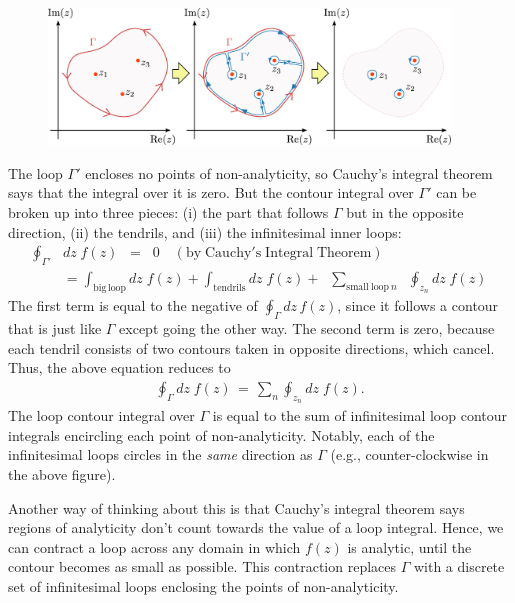 \documentclass[10pt,a4paper]{article}
\begin{document}
\begin{figure}[H]
  \centering\includegraphics[width=0.95\textwidth]{contour_deformation}
\end{figure}

The loop $\Gamma'$ encloses no points of non-analyticity, so Cauchy's
integral theorem says that the integral over it is zero.  But the
contour integral over $\Gamma'$ can be broken up into three pieces:
(i) the part that follows $\Gamma$ but in the opposite direction, (ii)
the tendrils, and (iii) the infinitesimal inner loops:
\begin{align}
  \oint_{\Gamma'}& dz\; f(z)
\;\;= \;\; 0 \quad (\mathrm{by}\;\mathrm{Cauchy's}\;\mathrm{Integral}\;\mathrm{Theorem}) \\
&= \int_{\mathrm{big}\,\mathrm{loop}} dz\; f(z) + \int_{\mathrm{tendrils}} dz\; f(z) +\; \;\sum_{\mathrm{small~loop}~n}\;\; \oint_{z_n} dz\; f(z)
\end{align}
The first term is equal to the negative of $\oint_\Gamma dz \, f(z)$,
since it follows a contour that is just like $\Gamma$ except going the
other way.  The second term is zero, because each tendril consists of
two contours taken in opposite directions, which cancel.  Thus, the
above equation reduces to
\begin{align}
  \oint_\Gamma dz\; f(z) \,=\, \sum_n \oint_{z_n} dz\; f(z).
\end{align}
The loop contour integral over $\Gamma$ is equal to the sum of
infinitesimal loop contour integrals encircling each point of
non-analyticity. Notably, each of the infinitesimal loops circles in
the \textit{same} direction as $\Gamma$ (e.g., counter-clockwise in
the above figure).

Another way of thinking about this is that Cauchy's integral theorem
says regions of analyticity don't count towards the value of a loop
integral.  Hence, we can contract a loop across any domain in which
$f(z)$ is analytic, until the contour becomes as small as possible.
This contraction replaces $\Gamma$ with a discrete set of
infinitesimal loops enclosing the points of non-analyticity.
\end{document}
